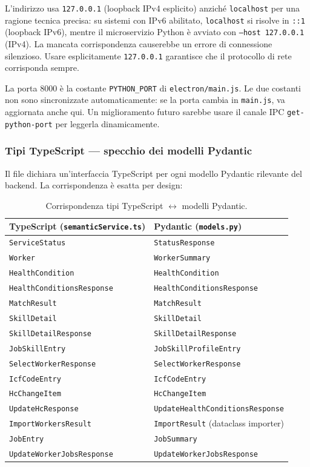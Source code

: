 \documentclass[a4paper,12pt]{article}
\begin{document}
\noindent L'indirizzo usa \texttt{127.0.0.1} (loopback IPv4 esplicito) anzich\'{e}
\texttt{localhost} per una ragione tecnica precisa: su sistemi con IPv6
abilitato, \texttt{localhost} si risolve in \texttt{::1} (loopback IPv6),
mentre il microservizio Python \`{e} avviato con \texttt{--host 127.0.0.1}
(IPv4). La mancata corrispondenza causerebbe un errore di connessione
silenzioso. Usare esplicitamente \texttt{127.0.0.1} garantisce che il
protocollo di rete corrisponda sempre.

La porta 8000 \`{e} la costante \texttt{PYTHON\_PORT} di
\texttt{electron/\allowbreak main.js}. Le due costanti non sono sincronizzate
automaticamente: se la porta cambia in \texttt{main.js}, va aggiornata
anche qui. Un miglioramento futuro sarebbe usare il canale IPC
\texttt{get-python-port} per leggerla dinamicamente.

\subsubsection{Tipi TypeScript --- specchio dei modelli Pydantic}

Il file dichiara un'interfaccia TypeScript per ogni modello Pydantic
rilevante del backend. La corrispondenza \`{e} esatta per design:

\begin{table}[H]
\centering\small
\caption{Corrispondenza tipi TypeScript $\leftrightarrow$ modelli Pydantic.}
\begin{tabular}{L{5.5cm} L{6.5cm}}
\toprule
\textbf{TypeScript (\texttt{semanticService.ts})} & \textbf{Pydantic (\texttt{models.py})} \\
\midrule
\texttt{ServiceStatus} & \texttt{StatusResponse} \\
\texttt{Worker} & \texttt{WorkerSummary} \\
\texttt{HealthCondition} & \texttt{HealthCondition} \\
\texttt{HealthConditionsResponse} & \texttt{HealthConditionsResponse} \\
\texttt{MatchResult} & \texttt{MatchResult} \\
\texttt{SkillDetail} & \texttt{SkillDetail} \\
\texttt{SkillDetailResponse} & \texttt{SkillDetailResponse} \\
\texttt{JobSkillEntry} & \texttt{JobSkillProfileEntry} \\
\texttt{SelectWorkerResponse} & \texttt{SelectWorkerResponse} \\
\texttt{IcfCodeEntry} & \texttt{IcfCodeEntry} \\
\texttt{HcChangeItem} & \texttt{HcChangeItem} \\
\texttt{UpdateHcResponse} & \texttt{UpdateHealthConditionsResponse} \\
\texttt{ImportWorkersResult} & \texttt{ImportResult} (dataclass importer) \\
\texttt{JobEntry} & \texttt{JobSummary} \\
\texttt{UpdateWorkerJobsResponse} & \texttt{UpdateWorkerJobsResponse} \\
\bottomrule
\end{tabular}
\end{table}
\end{document}
